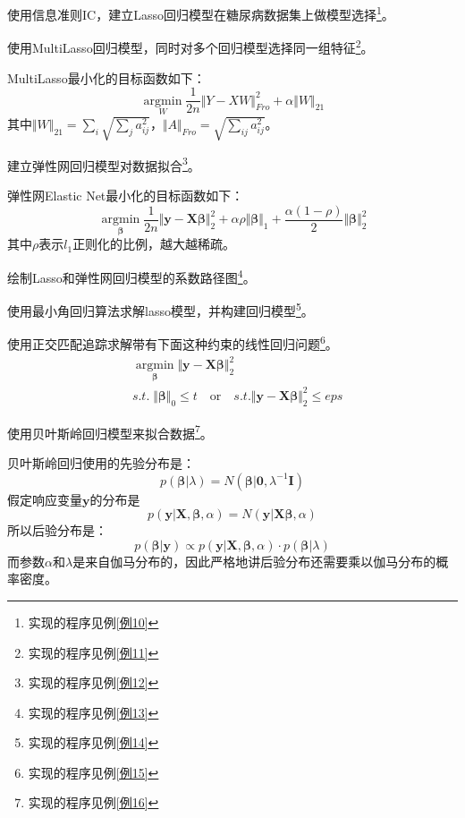 \begin{Example}
	使用信息准则IC，建立Lasso回归模型在糖尿病数据集上做模型选择\footnote{实现的程序见例\ref{例10}}。
\end{Example}

\begin{Example}
	使用MultiLasso回归模型，同时对多个回归模型选择同一组特征\footnote{实现的程序见例\ref{例11}}。

	MultiLasso最小化的目标函数如下：
	\[
	\mathop{\arg\min}\limits_{W}\dfrac{1}{2n}\Vert Y-XW\Vert^2_{Fro}+\alpha\Vert W\Vert_{21}
	\]
	其中$\Vert W\Vert_{21}=\sum\limits_{i}\sqrt{\sum\limits_{j}a^2_{ij}}$，$\Vert A\Vert_{Fro}=\sqrt{\sum\limits_{ij}a^2_{ij}}$。
\end{Example}

\begin{Example}
	建立弹性网回归模型对数据拟合\footnote{实现的程序见例\ref{例12}}。

	弹性网Elastic Net最小化的目标函数如下：
	\[
	\mathop{\arg\min}\limits_{\bm{\beta}}\dfrac{1}{2n}\Vert \bm{y}-\bm{X\beta}\Vert^2_2+\alpha\rho\Vert \bm{\beta}\Vert_1+\dfrac{\alpha(1-\rho)}{2}\Vert\bm{\beta}\Vert^2_2
	\]
	其中$\rho$表示$l_1$正则化的比例，越大越稀疏。
\end{Example}

\begin{Example}
	绘制Lasso和弹性网回归模型的系数路径图\footnote{实现的程序见例\ref{例13}}。
\end{Example}

\begin{Example}
	使用最小角回归算法求解lasso模型，并构建回归模型\footnote{实现的程序见例\ref{例14}}。
\end{Example}

\begin{Example}
	使用正交匹配追踪求解带有下面这种约束的线性回归问题\footnote{实现的程序见例\ref{例15}}。
	\[
		\begin{aligned}
	&\mathop{\arg\min}\limits_{\bm{\beta}}\Vert \bm{y}-\bm{X\beta}\Vert^2_2\\
	&s.t.\;\Vert \bm{\beta}\Vert_0\le t	\quad\text{or}\quad s.t.\Vert \bm{y}-\bm{X\beta}\Vert^2_2\le eps
		\end{aligned}
	\]
\end{Example}

\begin{Example}
	使用贝叶斯岭回归模型来拟合数据\footnote{实现的程序见例\ref{例16}}。
	
	贝叶斯岭回归使用的先验分布是：
	\[
	p(\bm{\beta}|\lambda)=N(\bm{\beta}|\bm{0},\lambda^{-1}\bm{I})
	\]
	假定响应变量$\bm{y}$的分布是
	\[
	p(\bm{y}|\bm{X},\bm{\beta},\alpha)=N(\bm{y}|\bm{X\beta},\alpha)
	\]
	所以后验分布是：
	\[
	p(\bm{\beta}|\bm{y})\propto p(\bm{y}|\bm{X},\bm{\beta},\alpha)\cdot p(\bm{\beta}|\lambda)
	\]
	而参数$\alpha$和$\lambda$是来自伽马分布的，因此严格地讲后验分布还需要乘以伽马分布的概率密度。
\end{Example}

